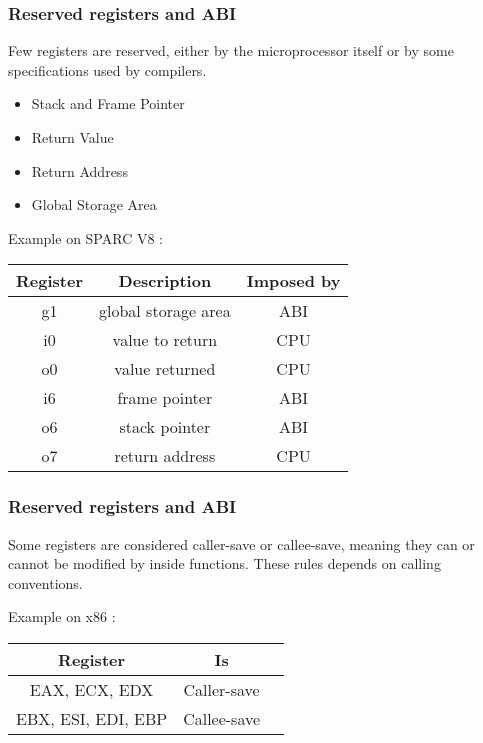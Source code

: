 
\begin{frame}
  \frametitle{Reserved registers and ABI}

  Few registers are reserved, either by the microprocessor itself or
  by some specifications used by compilers.

  \begin{itemize}
  \item
    Stack and Frame Pointer
  \item
    Return Value
  \item
    Return Address
  \item
    Global Storage Area
  \end{itemize}

  Example on SPARC V8 :

  \begin{center}
  \begin{tabular}{|c|c|c|}
    \hline
    Register & Description & Imposed by \\
    \hline
    g1 & global storage area & ABI \\
    \hline
    i0 & value to return & CPU \\
    \hline
    o0 & value returned & CPU \\
    \hline
    i6 & frame pointer & ABI \\
    \hline
    o6 & stack pointer & ABI \\
    \hline
    o7 & return address & CPU \\
    \hline
  \end{tabular}
  \end{center}

\end{frame}


\begin{frame}
  \frametitle{Reserved registers and ABI}

  Some registers are considered caller-save or callee-save, meaning
  they can or cannot be modified by inside functions. These rules
  depends on calling conventions.

  \-

  Example on x86 :

  \begin{center}
  \begin{tabular}{|c|c|c|}
    \hline
    Register & Is \\
    \hline
    EAX, ECX, EDX & Caller-save \\
    \hline
    EBX, ESI, EDI, EBP & Callee-save \\
    \hline
  \end{tabular}
  \end{center}

\end{frame}

